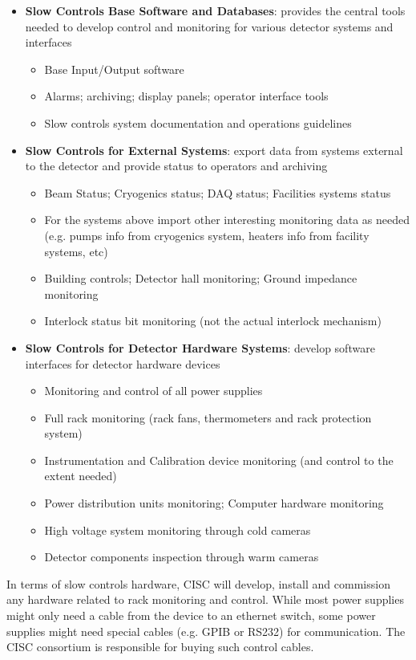 \begin{itemize}
\item {\bf Slow Controls Base Software and Databases}: provides the central tools needed to develop control and monitoring for various detector systems and interfaces
  \begin{itemize}
  \item Base Input/Output software
  \item Alarms; archiving; display panels; operator interface tools
  \item Slow controls system documentation and operations guidelines
  \end{itemize}
\item {\bf Slow Controls for External Systems}: export data from systems external to the detector and provide status to operators and archiving
  \begin{itemize}
  \item Beam Status; Cryogenics status; DAQ status; Facilities systems status
  \item For the systems above import other interesting monitoring data as needed (e.g. pumps info from cryogenics system, heaters info from facility systems, etc)
  \item Building controls; Detector hall monitoring; Ground impedance monitoring
  \item Interlock status bit monitoring (not the actual interlock mechanism)
  \end{itemize}
\item {\bf Slow Controls for Detector Hardware Systems}: develop software interfaces for detector hardware devices
  \begin{itemize}
  \item Monitoring and control of all power supplies
  \item Full rack monitoring (rack fans, thermometers and rack protection system)
  \item Instrumentation and Calibration device monitoring (and control to the extent needed)
  \item Power distribution units monitoring; Computer hardware monitoring
  \item High voltage system monitoring through cold cameras
  \item Detector components inspection through warm cameras
  \end{itemize}
\end{itemize}

In terms of slow controls hardware, CISC will develop, install and
commission any hardware related to rack monitoring and control. While
most power supplies might only need a cable from the device to an
ethernet switch, some power supplies might need special cables (e.g.
GPIB or RS232) for communication. The CISC consortium is responsible for
buying such control cables.

